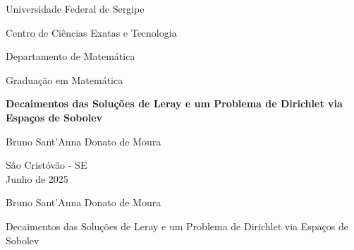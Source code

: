 \begin{center}

\begin{singlespace}

{\large{Universidade Federal de Sergipe}}

{\large{Centro de Ciências Exatas e Tecnologia}}

{\large{Departamento de Matemática}}

{\large{Graduação em Matemática}}
\end{singlespace}



\vspace{3.0cm}


\LARGE{{\textbf{Decaimentos das Soluções de Leray e um Problema de Dirichlet via Espaços de Sobolev}}}

\vspace {3cm}

{\Large{Bruno Sant'Anna Donato de Moura}}

\vspace{5.0cm}


\begin{singlespace}
\large{São Cristóvão - SE}\\
\large{Junho de 2025}
\end{singlespace}

\end{center}

\pagebreak


\thispagestyle{empty}

\begin{center}
	
	{\large Bruno Sant'Anna Donato de Moura}
	
	\vspace{6.5cm}
	
	{\Large{Decaimentos das Soluções de Leray e um Problema de Dirichlet via Espaços de Sobolev}}
	
\end{center}

\vspace{1.5cm}

\vfill

{\large
	
}
\vfill
{\large {}}

